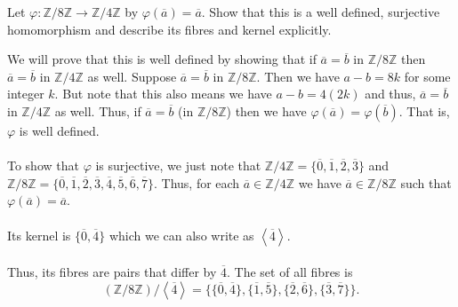 \documentclass[12 pt, letterpaper]{hmcpset}
\begin{document}
\pagebreak

\begin{problem}
	Let $\varphi : \mathbb{Z}/8\mathbb{Z} \to \mathbb{Z}/4\mathbb{Z}$ by $\varphi(\overline{a}) = \overline{a}$. Show that this is a well defined, surjective homomorphism and describe its fibres and kernel explicitly.
\end{problem}

\begin{solution}
	We will prove that this is well defined by showing that if $\overline{a} = \overline{b}$ in $\mathbb{Z} / 8 \mathbb{Z}$ then $\overline{a} = \overline{b}$ in $\mathbb{Z} / 4 \mathbb{Z}$ as well. Suppose $\overline{a} = \overline{b}$ in $\mathbb{Z} / 8 \mathbb{Z}$. Then we have $a - b = 8k$ for some integer $k$. But note that this also means we have $a - b = 4(2k)$ and thus, $\overline{a} = \overline{b}$ in $\mathbb{Z}/4\mathbb{Z}$ as well. Thus, if $\overline{a} = \overline{b}$ (in $\mathbb{Z}/8 \mathbb{Z}$) then we have $\varphi(\overline{a}) = \varphi(\overline{b})$. That is, $\varphi$ is well defined. \\\\
	To show that $\varphi$ is surjective, we just note that $\mathbb{Z}/4\mathbb{Z} = \{ \overline{0}, \overline{1}, \overline{2}, \overline{3} \}$ and $\mathbb{Z}/8 \mathbb{Z} = \{ \overline{0}, \overline{1}, \overline{2}, \overline{3}, \overline{4}, \overline{5}, \overline{6}, \overline{7} \}$. Thus, for each $\overline{a} \in \mathbb{Z}/4 \mathbb{Z}$ we have $\overline{a} \in \mathbb{Z}/ 8 \mathbb{Z}$ such that $\varphi(\overline{a}) = \overline{a}$. \\\\
	Its kernel is $\{ \overline{0}, \overline{4} \}$ which we can also write as $\left < \overline{4} \right >$. \\\\
	Thus, its fibres are pairs that differ by $\overline{4}$. The set of all fibres is
	\[
		(\mathbb{Z}/8\mathbb{Z})/\left < \overline{4} \right > = \{ \{ \overline{0}, \overline{4} \}, \{ \overline{1}, \overline{5} \}, \{ \overline{2}, \overline{6} \}, \{ \overline{3}, \overline{7} \} \}.
	\]
\end{solution}
\end{document}
